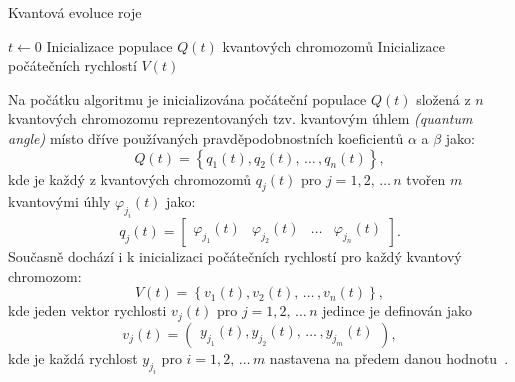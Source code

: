 \begin{algorithm}[ht]
    \caption{Kvantová evoluce roje~\cite{qse}}
    \label{alg:qse}
    $t \gets 0$\;
    Inicializace populace $Q\left(t\right)$ kvantových chromozomů\;
    Inicializace počátečních rychlostí $V\left(t\right)$\;
\end{algorithm}

Na počátku algoritmu je inicializována počáteční populace $Q\left(t\right)$ složená z $n$ kvantových chromozomu reprezentovaných tzv. kvantovým úhlem \emph{(quantum angle)} místo dříve používaných pravděpodobnostních koeficientů $\alpha$ a $\beta$ jako:
\begin{equation*}
    Q\left(t\right) = \left\{q_1\left(t\right), q_2\left(t\right),\,\dots\,,q_n\left(t\right)\right\},
\end{equation*}
kde je každý z kvantových chromozomů $q_j\left(t\right)$ pro $j=1,2,\,\dots\,n$ tvořen $m$ kvantovými úhly $\varphi_{j_i}\left(t\right)$ jako:
\begin{equation*}
    q_j\left(t\right) = \begin{bmatrix} \varphi_{j_1}\left(t\right) & \varphi_{j_2}\left(t\right) & \dots & \varphi_{j_n}\left(t\right) \end{bmatrix}.
\end{equation*}
Současně dochází i k inicializaci počátečních rychlostí pro každý kvantový chromozom:
\begin{equation*}
    V\left(t\right) = \left\{ v_1\left(t\right), v_2\left(t\right) ,\,\dots\,, v_n\left(t\right)\right\},
\end{equation*}
kde jeden vektor rychlosti $v_j\left(t\right)$ pro $j=1,2,\,\dots\,n$ jedince je definován jako
\begin{equation*}
    v_j\left(t\right) = \begin{pmatrix} y_{j_1}\left(t\right), y_{j_2}\left(t\right),\,\dots\,, y_{j_m}\left(t\right) \end{pmatrix},
\end{equation*}
kde je každá rychlost $y_{j_i}$ pro $i=1,2,\,\dots\,m$ nastavena na předem danou hodnotu~\cite{qse}.

